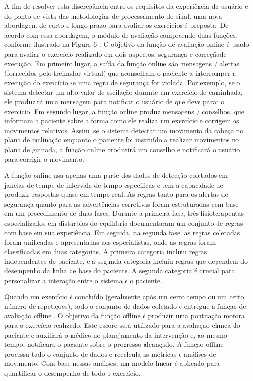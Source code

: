\documentclass[10pt,a4paper,compsoc]{IEEEtran}
\begin{document}
A fim de resolver esta discrepância entre os requisitos da experiência do usuário e do ponto de vista das metodologias de processamento de sinal, uma nova abordagem de curto e longo prazo para avaliar os exercícios é proposta. De acordo com essa abordagem, o módulo de avaliação compreende duas funções, conforme ilustrado na Figura 6 . O objetivo da função de avaliação online é usado para avaliar o exercício realizado em dois aspectos, segurança e correçãode execução. Em primeiro lugar, a saída da função online são mensagens / alertas (fornecidos pelo treinador virtual) que aconselham o paciente a interromper a execução do exercício se uma regra de segurança for violada. Por exemplo, se o sistema detectar um alto valor de oscilação durante um exercício de caminhada, ele produzirá uma mensagem para notificar o usuário de que deve parar o exercício. Em segundo lugar, a função online produz mensagens / conselhos, que informam o paciente sobre a forma como ele realiza um exercício e corrigem os movimentos relativos. Assim, se o sistema detectar um movimento da cabeça no plano de inclinação enquanto o paciente foi instruído a realizar movimentos no plano de guinada, a função online produzirá um conselho e notificará o usuário para corrigir o movimento.

A função online usa apenas uma parte dos dados de detecção coletados em janelas de tempo de intervalo de tempo específicas e tem a capacidade de produzir respostas quase em tempo real. As regras tanto para os alertas de segurança quanto para as advertências corretivas foram estruturadas com base em um procedimento de duas fases. Durante a primeira fase, três fisioterapeutas especializados em distúrbios do equilíbrio documentaram um conjunto de regras com base em sua experiência. Em seguida, na segunda fase, as regras coletadas foram unificadas e apresentadas aos especialistas, onde as regras foram classificadas em duas categorias. A primeira categoria incluiu regras independentes do paciente, e a segunda categoria incluiu regras que dependem do desempenho da linha de base do paciente. A segunda categoria é crucial para personalizar a interação entre o sistema e o paciente.

Quando um exercício é concluído (geralmente após um certo tempo ou um certo número de repetições), todo o conjunto de dados coletado é entregue à função de avaliação offline . O objetivo da função offline é produzir uma pontuação motora para o exercício realizado. Este escore será utilizado para a avaliação clínica do paciente e auxiliará o médico no planejamento da intervenção e, ao mesmo tempo, notificará o paciente sobre o progresso alcançado. A função offline processa todo o conjunto de dados e recalcula as métricas e análises de movimento. Com base nessas análises, um modelo linear é aplicado para quantificar o desempenho de todo o exercício.
\end{document}
